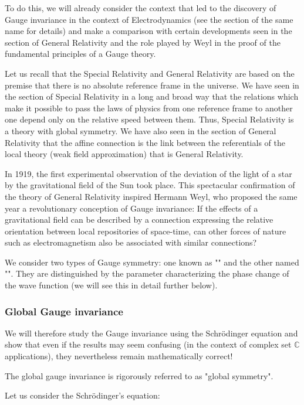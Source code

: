 	To do this, we will already consider the context that led to the discovery of Gauge invariance in the context of Electrodynamics (see the section of the same name for details) and make a comparison with certain developments seen in the section of General Relativity and the role played by Weyl in the proof of the fundamental principles of a Gauge theory.

	Let us recall that the Special Relativity and General Relativity are based on the premise that there is no absolute reference frame in the universe. We have seen in the section of Special Relativity in a long and broad way that the relations which make it possible to pass the laws of physics from one reference frame to another one depend only on the relative speed between them. Thus, Special Relativity is a theory with global symmetry. We have also seen in the section of General Relativity that the affine connection is the link between the referentials of the local theory (weak field approximation) that is General Relativity.
	
	In 1919, the first experimental observation of the deviation of the light of a star by the gravitational field of the Sun took place. This spectacular confirmation of the theory of General Relativity inspired Hermann Weyl, who proposed the same year a revolutionary conception of Gauge invariance: If the effects of a gravitational field can be described by a connection expressing the relative orientation between local repositories of space-time, can other forces of nature such as electromagnetism also be associated with similar connections?

	We consider two types of Gauge symmetry: one known as "" and the other named "". They are distinguished by the parameter characterizing the phase change of the wave function (we will see this in detail further below).
	
	\subsubsection{Global Gauge invariance}
	We will therefore study the Gauge invariance using the Schrödinger equation and show that even if the results may seem confusing (in the context of complex set $\mathbb{C}$ applications), they nevertheless remain mathematically correct!
	\begin{tcolorbox}[title=Remark,colframe=black,arc=10pt]
	The global gauge invariance is rigorously referred to as "global symmetry".
	\end{tcolorbox}
	Let us consider the Schrödinger's equation:
	
